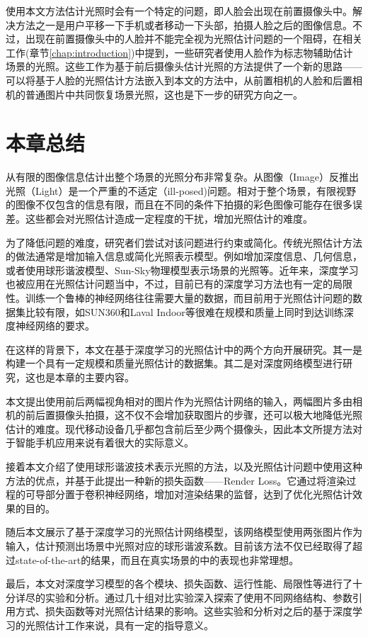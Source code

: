 使用本文方法估计光照时会有一个特定的问题，即人脸会出现在前置摄像头中。解决方法之一是用户平移一下手机或者移动一下头部，拍摄人脸之后的图像信息。不过，出现在前置摄像头中的人脸并不能完全视为光照估计问题的一个阻碍，在相关工作(章节\ref{chap:introduction})中提到，一些研究者使用人脸作为标志物辅助估计场景的光照。这些工作为基于前后摄像头估计光照的方法提供了一个新的思路——可以将基于人脸的光照估计方法嵌入到本文的方法中，从前置相机的人脸和后置相机的普通图片中共同恢复场景光照，这也是下一步的研究方向之一。
\section{本章总结}
从有限的图像信息估计出整个场景的光照分布非常复杂。从图像（Image）反推出光照（Light）是一个严重的不适定（ill-posed)问题。相对于整个场景，有限视野的图像不仅包含的信息有限，而且在不同的条件下拍摄的彩色图像可能存在很多误差。这些都会对光照估计造成一定程度的干扰，增加光照估计的难度。

为了降低问题的难度，研究者们尝试对该问题进行约束或简化。传统光照估计方法的做法通常是增加输入信息或简化光照表示模型。例如增加深度信息、几何信息，或者使用球形谐波模型、Sun-Sky物理模型表示场景的光照等。近年来，深度学习也被应用在光照估计问题当中，不过，目前已有的深度学习方法也有一定的局限性。训练一个鲁棒的神经网络往往需要大量的数据，而目前用于光照估计问题的数据集比较有限，如SUN360\cite{xiao2012recognizing}和Laval Indoor\cite{gardner2017learning}等很难在规模和质量上同时到达训练深度神经网络的要求。

在这样的背景下，本文在基于深度学习的光照估计中的两个方向开展研究。其一是构建一个具有一定规模和质量光照估计的数据集。其二是对深度网络模型进行研究，这也是本章的主要内容。

本文提出使用前后两幅视角相对的图片作为光照估计网络的输入，两幅图片多由相机的前后置摄像头拍摄，这不仅不会增加获取图片的步骤，还可以极大地降低光照估计的难度。现代移动设备几乎都包含前后至少两个摄像头，因此本文所提方法对于智能手机应用来说有着很大的实际意义。

接着本文介绍了使用球形谐波技术表示光照的方法，以及光照估计问题中使用这种方法的优点，并基于此提出一种新的损失函数——Render Loss。它通过将渲染过程的可导部分置于卷积神经网络，增加对渲染结果的监督，达到了优化光照估计效果的目的。

随后本文展示了基于深度学习的光照估计网络模型，该网络模型使用两张图片作为输入，估计预测出场景中光照对应的球形谐波系数。目前该方法不仅已经取得了超过state-of-the-art的结果，而且在真实场景的中的表现也非常理想。

最后，本文对深度学习模型的各个模块、损失函数、运行性能、局限性等进行了十分详尽的实验和分析。通过几十组对比实验深入探索了使用不同网络结构、参数引用方式、损失函数等对光照估计结果的影响。这些实验和分析对之后的基于深度学习的光照估计工作来说，具有一定的指导意义。